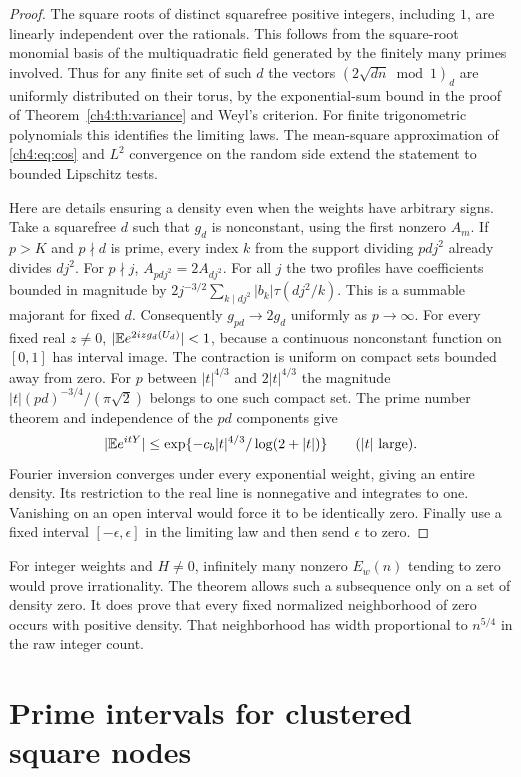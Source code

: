 \documentclass[11pt,a4paper,oneside,openany]{report}
\theoremstyle{remark}\newtheorem{remark}[theorem]{Remark}
\numberwithin{equation}{section}
\begin{document}
\begin{proof}
The square roots of distinct squarefree positive integers, including $1$, are linearly independent over the rationals. This follows from the square-root monomial basis of the multiquadratic field generated by the finitely many primes involved. Thus for any finite set of such $d$ the vectors $(2\sqrt{dn}\bmod 1)_d$ are uniformly distributed on their torus, by the exponential-sum bound in the proof of Theorem~\ref{ch4:th:variance} and Weyl's criterion. For finite trigonometric polynomials this identifies the limiting laws. The mean-square approximation of \eqref{ch4:eq:cos} and $L^2$ convergence on the random side extend the statement to bounded Lipschitz tests.

Here are details ensuring a density even when the weights have arbitrary signs. Take a squarefree $d$ such that $g_d$ is nonconstant, using the first nonzero $A_m$. If $p>K$ and $p\nmid d$ is prime, every index $k$ from the support dividing $pdj^2$ already divides $dj^2$. For $p\nmid j$, $A_{pdj^2}=2A_{dj^2}$. For all $j$ the two profiles have coefficients bounded in magnitude by $2j^{-3/2}\sum_{k\mid dj^2}|b_k|\tau(dj^2/k)$. This is a summable majorant for fixed $d$. Consequently $g_{pd}\to2g_d$ uniformly as $p\to\infty$. For every fixed real $z\ne0$, $|\mathbb E e^{2izg_d(U_d)}|<1$, because a continuous nonconstant function on $[0,1]$ has interval image. The contraction is uniform on compact sets bounded away from zero. For $p$ between $|t|^{4/3}$ and $2|t|^{4/3}$ the magnitude $|t|(pd)^{-3/4}/(\pi\sqrt2)$ belongs to one such compact set. The prime number theorem and independence of the $pd$ components give
\[
 |\mathbb E e^{itY}|\le\exp\{-c_b|t|^{4/3}/\log(2+|t|)\}\qquad(|t|\text{ large}).
\]
Fourier inversion converges under every exponential weight, giving an entire density. Its restriction to the real line is nonnegative and integrates to one. Vanishing on an open interval would force it to be identically zero. Finally use a fixed interval $[-\epsilon,\epsilon]$ in the limiting law and then send $\epsilon$ to zero.
\end{proof}
For integer weights and $H\ne0$, infinitely many nonzero $E_w(n)$ tending to zero would prove irrationality. The theorem allows such a subsequence only on a set of density zero. It does prove that every fixed normalized neighborhood of zero occurs with positive density. That neighborhood has width proportional to $n^{5/4}$ in the raw integer count.

\section{Prime intervals for clustered square nodes}
\label{ch4:sec:square-cluster-geometry}
\end{document}
